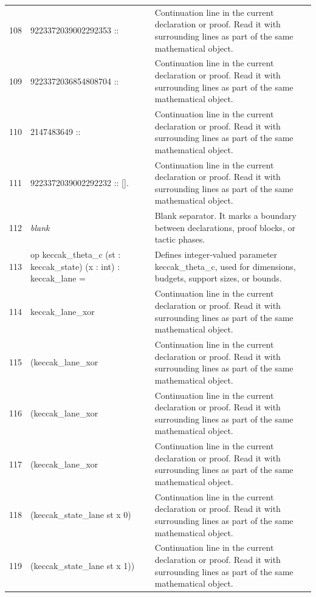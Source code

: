 \documentclass[10pt]{article}
\begin{document}
\begin{longtable}{r L{0.53\textwidth} L{0.37\textwidth}}
108 & {\ttfamily\scriptsize   9223372039002292353 ::} & Continuation line in the current declaration or proof.  Read it with surrounding lines as part of the same mathematical object. \\
109 & {\ttfamily\scriptsize   9223372036854808704 ::} & Continuation line in the current declaration or proof.  Read it with surrounding lines as part of the same mathematical object. \\
110 & {\ttfamily\scriptsize   2147483649 ::} & Continuation line in the current declaration or proof.  Read it with surrounding lines as part of the same mathematical object. \\
111 & {\ttfamily\scriptsize   9223372039002292232 :: [].} & Continuation line in the current declaration or proof.  Read it with surrounding lines as part of the same mathematical object. \\
112 & {\ttfamily\scriptsize \emph{blank}} & Blank separator.  It marks a boundary between declarations, proof blocks, or tactic phases. \\
113 & {\ttfamily\scriptsize op keccak\_theta\_c (st : keccak\_state) (x : int) : keccak\_lane =} & Defines integer-valued parameter keccak\_theta\_c, used for dimensions, budgets, support sizes, or bounds. \\
114 & {\ttfamily\scriptsize   keccak\_lane\_xor} & Continuation line in the current declaration or proof.  Read it with surrounding lines as part of the same mathematical object. \\
115 & {\ttfamily\scriptsize     (keccak\_lane\_xor} & Continuation line in the current declaration or proof.  Read it with surrounding lines as part of the same mathematical object. \\
116 & {\ttfamily\scriptsize       (keccak\_lane\_xor} & Continuation line in the current declaration or proof.  Read it with surrounding lines as part of the same mathematical object. \\
117 & {\ttfamily\scriptsize         (keccak\_lane\_xor} & Continuation line in the current declaration or proof.  Read it with surrounding lines as part of the same mathematical object. \\
118 & {\ttfamily\scriptsize           (keccak\_state\_lane st x 0)} & Continuation line in the current declaration or proof.  Read it with surrounding lines as part of the same mathematical object. \\
119 & {\ttfamily\scriptsize           (keccak\_state\_lane st x 1))} & Continuation line in the current declaration or proof.  Read it with surrounding lines as part of the same mathematical object. \\

\end{longtable}
\end{document}
